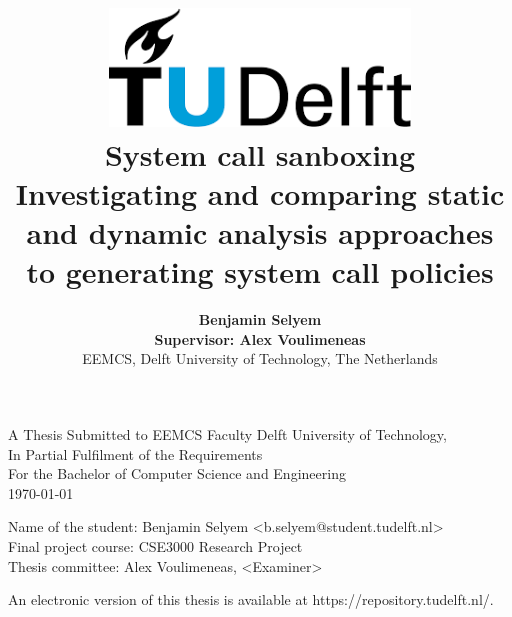 \title{
    \includegraphics[width=8cm, keepaspectratio]{tudelftlogo.png}\\
    \vspace*{2cm}
    \textbf{
        System call sanboxing\\
        {\large Investigating and comparing static and dynamic analysis approaches to generating system call policies}
    }\\
    \vspace*{1cm}
}

\author{
    \textbf{
Benjamin Selyem}\\
    \hfill \break
    \textbf{Supervisor: Alex Voulimeneas}\\
    \break
    {\large 
        \hfill \break
        EEMCS, Delft University of Technology, The Netherlands
    }\\
}

\date{}

\maketitle
\thispagestyle{empty}

\let\clearpagebackup\clearpage
\renewcommand{\clearpage}{ }

\onecolumn

\vspace*{1.5cm}
\begin{center}
    A Thesis Submitted to EEMCS Faculty Delft University of Technology,\\
    In Partial Fulfilment of the Requirements\\
    For the Bachelor of Computer Science and Engineering\\
    \today
\end{center}

\vspace*{2cm}

\noindent
{\small
Name of the student: Benjamin Selyem \textless b.selyem@student.tudelft.nl\textgreater\\
Final project course: CSE3000 Research Project\\
Thesis committee: Alex Voulimeneas, \textless Examiner\textgreater\\ %
}
\vfill

\begin{center}
    An electronic version of this thesis is available at https://repository.tudelft.nl/.
\end{center}

\twocolumn
\let\clearpage\clearpagebackup  
\clearpage
\setcounter{page}{1}

